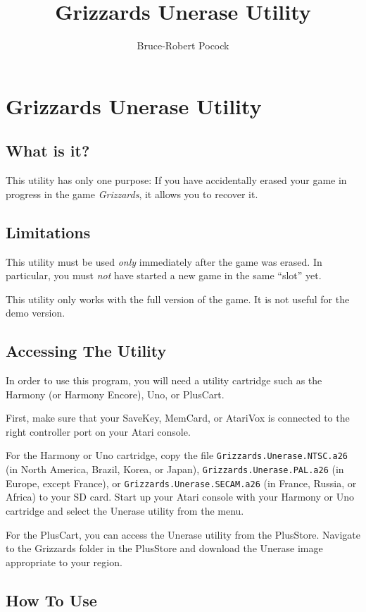 \documentclass[article]{memoir}
\title{Grizzards Unerase Utility}
\author{Bruce-Robert Pocock}
\begin{document}
\chapter*{Grizzards Unerase Utility}

\section*{What is it?}

This utility has only one purpose:  If you have accidentally erased your
game  in progress  in  the  game \textit{Grizzards},  it  allows you  to
recover it.

\section*{Limitations}

This  utility must  be  used \textit{only}  immediately  after the  game
was erased. In particular, you must \textit{not} have started a new game
in the same ``slot'' yet.

This utility  only works with  the full version of  the game. It  is not
useful for the demo version.

\section*{Accessing The Utility}

In order to use this program, you  will need a utility cartridge such as
the Harmony (or Harmony Encore), Uno, or PlusCart.

First, make sure that your SaveKey, MemCard, or AtariVox is connected to
the right controller port on your Atari console.

For    the    Harmony    or     Uno    cartridge,    copy    the    file
\texttt{Grizzards.Unerase.NTSC.a26} (in North America, Brazil, Korea, or
Japan), \texttt{Grizzards.Unerase.PAL.a26}  (in Europe,  except France),
or \texttt{Grizzards.Unerase.SECAM.a26}  (in France, Russia,  or Africa)
to your SD  card. Start up your  Atari console with your  Harmony or Uno
cartridge and select the Unerase utility from the menu.

For the PlusCart, you can access the Unerase utility from the PlusStore.
Navigate  to the  Grizzards folder  in  the PlusStore  and download  the
Unerase image appropriate to your region.

\clearpage

\section*{How To Use}
\end{document}
